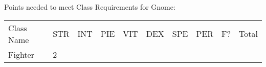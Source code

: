 \documentclass[12pt]{article}
\newcommand{\indexRace}[1]{\index{#1}}
\newcommand{\race}[1]{#1\indexRace{#1}}
\newcommand{\indexClass}[1]{\index{#1}}
\newcommand{\class}[1]{#1\indexClass{#1}}
\begin{document}
Points needed to meet Class Requirements for \race{Gnome}:

\begin{longtable}[]{@{}llllllllll@{}}
\toprule
\begin{minipage}[t]{0.13\columnwidth}\raggedright\strut
Class Name
\strut\end{minipage} &
\begin{minipage}[t]{0.06\columnwidth}\raggedright\strut
STR
\strut\end{minipage} &
\begin{minipage}[t]{0.06\columnwidth}\raggedright\strut
INT
\strut\end{minipage} &
\begin{minipage}[t]{0.06\columnwidth}\raggedright\strut
PIE
\strut\end{minipage} &
\begin{minipage}[t]{0.06\columnwidth}\raggedright\strut
VIT
\strut\end{minipage} &
\begin{minipage}[t]{0.06\columnwidth}\raggedright\strut
DEX
\strut\end{minipage} &
\begin{minipage}[t]{0.06\columnwidth}\raggedright\strut
SPE
\strut\end{minipage} &
\begin{minipage}[t]{0.06\columnwidth}\raggedright\strut
PER
\strut\end{minipage} &
\begin{minipage}[t]{0.07\columnwidth}\raggedright\strut
F?
\strut\end{minipage} &
\begin{minipage}[t]{0.08\columnwidth}\raggedright\strut
Total
\strut\end{minipage}\tabularnewline
\begin{minipage}[t]{0.13\columnwidth}\raggedright\strut
\class{Fighter}
\strut\end{minipage} &
\begin{minipage}[t]{0.06\columnwidth}\raggedright\strut
2
\strut\end{minipage} &
\begin{minipage}[t]{0.06\columnwidth}\raggedright\strut
\strut\end{minipage} &
\begin{minipage}[t]{0.06\columnwidth}\raggedright\strut
\strut\end{minipage} &
\begin{minipage}[t]{0.06\columnwidth}\raggedright\strut
\strut\end{minipage} &

\end{longtable}
\end{document}
